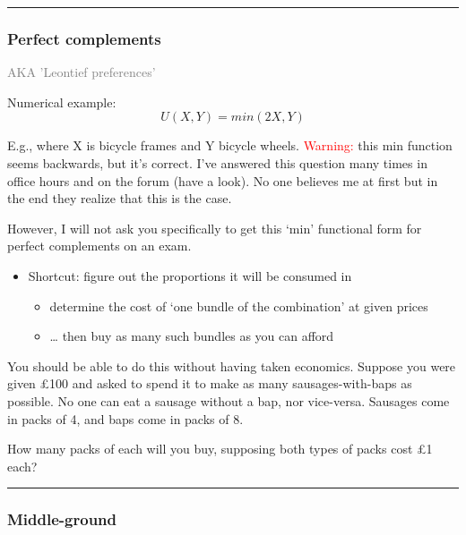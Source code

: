 \documentclass[]{article}
\providecommand{\tightlist}{%
  \setlength{\itemsep}{0pt}\setlength{\parskip}{0pt}}
\begin{document}
\begin{center}\rule{0.5\linewidth}{\linethickness}\end{center}

\hypertarget{perfect-complements}{%
\subsubsection{Perfect complements}\label{perfect-complements}}

\textcolor{gray}{AKA 'Leontief preferences'}

Numerical example:\\

\[U(X,Y)=min(2X,Y)\]

E.g., where X is bicycle frames and Y bicycle wheels.
\textcolor{red}{Warning:} this min function seems backwards, but it's
correct. I've answered this question many times in office hours and on
the forum (have a look). No one believes me at first but in the end they
realize that this is the case.

However, I will not ask you specifically to get this `min' functional
form for perfect complements on an exam.

\bigskip

\begin{itemize}
\tightlist
\item
  Shortcut: figure out the proportions it will be consumed in

  \begin{itemize}
  \tightlist
  \item
    determine the cost of `one bundle of the combination' at given
    prices
  \item
    \ldots{} then buy as many such bundles as you can afford
  \end{itemize}
\end{itemize}

You should be able to do this without having taken economics. Suppose
you were given £100 and asked to spend it to make as many
sausages-with-baps as possible. No one can eat a sausage without a bap,
nor vice-versa. Sausages come in packs of 4, and baps come in packs of
8.

How many packs of each will you buy, supposing both types of packs cost
£1 each?

\begin{center}\rule{0.5\linewidth}{\linethickness}\end{center}

\hypertarget{middle-ground}{%
\subsubsection{Middle-ground}\label{middle-ground}}
\end{document}
